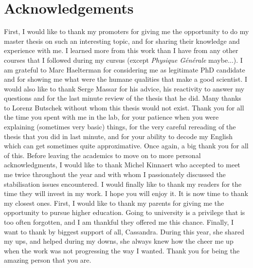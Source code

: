 \chapter*{Acknowledgements}

First, I would like to thank my promoters for giving me the opportunity to do my master thesis on such an interesting topic, and for sharing their knowledge and experience with me. I learned more from this work than I have from any other courses that I followed during my cursus (except \textit{Physique Générale} maybe...). I am grateful to Marc Haelterman for considering me as legitimate PhD candidate and for showing me what were the humane qualities that make a good scientist. I would also like to thank Serge Massar for his advice, his reactivity to answer my questions and for the last minute review of the thesis that he did. Many thanks to Lorenz Butschek without whom this thesis would not exist. Thank you for all the time you spent with me in the lab, for your patience when you were explaining (sometimes very basic) things, for the very careful rereading of the thesis that you did in last minute, and for your ability to decode my English which can get sometimes quite approximative. Once again, a big thank you for all of this. Before leaving the academics to move on to more personal acknowledgments, I would like to thank Michel Kinnaert who accepted to meet me twice throughout the year and with whom I passionately discussed the stabilisation issues encountered. I would finally like to thank my readers for the time they will invest in my work. I hope you will enjoy it. It is now time to thank my closest ones. First, I would like to thank my parents for giving me the opportunity to pursue higher education. Going to university is a privilege that is too often forgotten, and I am thankful they offered me this chance. Finally, I want to thank by biggest support of all, Cassandra. During this year, she shared my ups, and helped during my downs, she always knew how the cheer me up when the work was not progressing the way I wanted. Thank you for being the amazing person that you are.